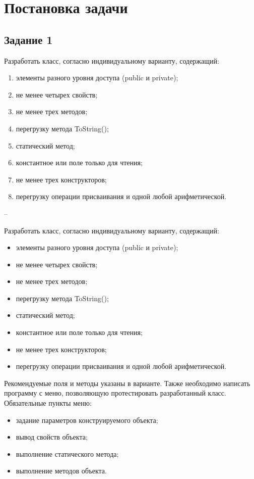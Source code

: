 \chapter{Постановка задачи}

\section{Задание 1}

Разработать класс, согласно индивидуальному варианту, содержащий:

\begin{enumerate}
	\item элементы разного уровня доступа (public и private);
	\item не менее четырех свойств; 
	\item не менее трех методов;
	\item перегрузку метода ToString();
	\item статический метод;
	\item константное или поле только для чтения;
	\item не менее трех конструкторов;
	\item перегрузку операции присваивания и одной любой арифметической.
\end{enumerate}

--

Разработать класс, согласно индивидуальному варианту, содержащий:

\begin{itemize}
	\item элементы разного уровня доступа (public и private);
	\item не менее четырех свойств; 
	\item не менее трех методов;
	\item перегрузку метода ToString();
	\item статический метод;
	\item константное или поле только для чтения;
	\item не менее трех конструкторов;
	\item перегрузку операции присваивания и одной любой арифметической.
\end{itemize}

Рекомендуемые поля и методы указаны в варианте. Также необходимо написать программу с меню, позволяющую протестировать
разработанный класс. Обязательные пункты меню:
\begin{itemize}
	\item задание параметров конструируемого объекта;
	\item вывод свойств объекта;
	\item выполнение статического метода;
	\item выполнение методов объекта.
\end{itemize}

